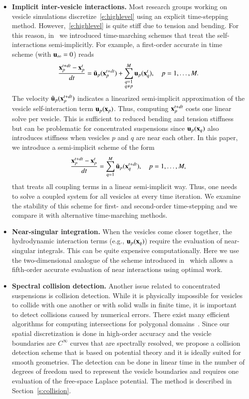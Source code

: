 \begin{itemize}
\item {\bf Implicit inter-vesicle interactions.} Most research groups
working on vesicle simulations discretize~\eqref{e:highlevel} using an
explicit time-stepping method. However,~\eqref{e:highlevel} is quite
stiff due to tension and bending.  For this reason, in~\cite{shravan}
we introduced time-marching schemes that treat the self-interactions
semi-implicitly.  For example, a first-order accurate in time scheme
(with ${\mathbf{u}}_\infty=0$) reads
\begin{align*}
  \frac{{\mathbf{x}}_p^{t+dt}-{\mathbf{x}}_p^t}{dt} = \tilde{{\mathbf{u}}}_p({\mathbf{x}}_p^{t+dt}) + 
    \sum_{\substack{q=1 \\ q \neq p}}^{M} {\mathbf{u}}_{p}({\mathbf{x}}_{q}^{t}), 
      \quad p=1,\ldots,M. 
\end{align*}
The velocity $\tilde{{\mathbf{u}}}_{p}({\mathbf{x}}_{p}^{t+dt})$ indicates a linearized
semi-implicit approximation of the vesicle self-interaction term
${\mathbf{u}}_{p}({\mathbf{x}}_{p})$.  Thus, computing ${\mathbf{x}}_{p}^{t+dt}$ costs one linear
solve per vesicle.  This is sufficient to reduced bending and tension
stiffness but can be problematic for concentrated suspensions since
${\mathbf{u}}_{p}({\mathbf{x}}_{q})$ also introduces stiffness when vesicles $p$ and $q$
are near each other.  In this paper, we introduce a semi-implicit
scheme of the form
\begin{align*}
  \frac{{\mathbf{x}}_p^{t+dt}-{\mathbf{x}}_p^t}{dt} = \sum_{q=1}^M 
    \tilde{{\mathbf{u}}}_p({\mathbf{x}}^{t+dt}_{q}), \quad p=1,\ldots,M,
\end{align*}
that treats all coupling terms in a linear semi-implicit way.  Thus,
one needs to solve a coupled system for all vesicles at every time
iteration.  We examine the stability of this scheme for first- and
second-order time-stepping and we compare it with alternative
time-marching methods.

\item {\bf Near-singular integration.} When the vesicles come closer
together, the hydrodynamic interaction terms (e.g., ${\mathbf{u}}_{p}({\mathbf{x}}_{q})$)
require the evaluation of near-singular integrals.  This can be quite
expensive computationally.  Here we use the two-dimensional analogue of
the scheme introduced in~\cite{ying-biros-zorin06} which allows a
fifth-order accurate evaluation of near interactions using optimal work.

\item {\bf Spectral collision detection.} Another issue related to
concentrated suspensions is collision detection.  While it is
physically impossible for vesicles to collide with one another or with
solid walls in finite time, it is important to detect collisions caused
by numerical errors.  There exist many efficient algorithms for
computing intersections for polygonal domains~\cite{jimenez-e13}.
Since our spatial discretization is done in high-order accuracy and the
vesicle boundaries are $C^\infty$ curves that are spectrally resolved,
we propose a collision detection scheme that is based on potential
theory and it is ideally suited for smooth geometries.  The detection
can be done in linear time in the number of degrees of freedom used to
represent the vesicle boundaries and requires one evaluation of the
free-space Laplace potential.  The method is described in
Section~\ref{s:collision}.


\end{itemize}
